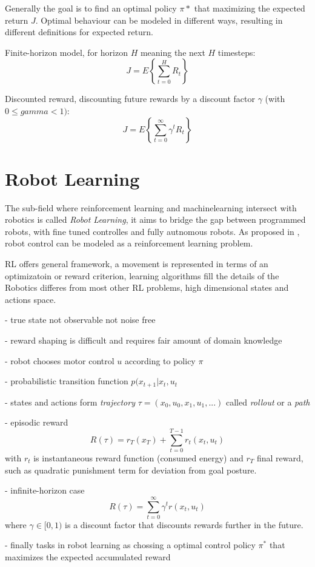 Generally the goal is to find an optimal policy $\pi*$ that
maximizing the expected return $J$.
Optimal behaviour can be modeled in different ways, resulting in different
definitions for expected return.

Finite-horizon model, for horizon $H$ meaning the next $H$ timesteps:
$$ J = E \left\{\sum^H_{t=0} R_t \right\} $$

Discounted reward, discounting future rewards by a discount factor $\gamma$
(with $0 \leq gamma < 1)$:
$$ J = E \left\{\sum^{\infty}_{t=0} \gamma^t R_t \right\} $$

\section{Robot Learning}
The sub-field where reinforcement learning and machinelearning
intersect with robotics is called \textit{Robot Learning}, it aims to bridge
the gap between programmed robots,
with fine tuned controlles  and fully autnomous robots.
As proposed in \citet{deisenroth2013survey}, robot control can be modeled as
a reinforcement learning problem.

RL offers general framework, a movement is represented in terms of an optimizatoin or
reward criterion, learning algorithms fill the details of the
Robotics differes from most other RL problems, high dimensional states and actions space.

- true state not observable not noise free

- reward shaping is difficult and requires fair amount of domain knowledge

- robot chooses motor control $u$ according to policy $\pi$

- probabilistic transition function $p(x_{t+1} | x_t, u_t$

- states and actions form \textit{trajectory} $\tau = (x_0, u_0, x_1, u_1,...)$
called \textit{rollout} or a \textit{path}

- episodic reward
$$ R(\tau) = r_T(x_T) + \sum^{T-1}_{t=0} r_t(x_t,u_t) $$
with $r_t$ is instantaneous reward function (consumed energy) and
$r_T$ final reward, such as quadratic punishment term for deviation from goal posture.

- infinite-horizon case
$$ R(\tau) = \sum^{\infty}_{t=0} \gamma^t r(x_t, u_t) $$
where $\gamma \in [0,1)$ is a discount factor that discounts rewards further in the future.

- finally tasks in robot learning as chossing a optimal control policy $\pi^*$ that
maximizes the expected accumulated reward

